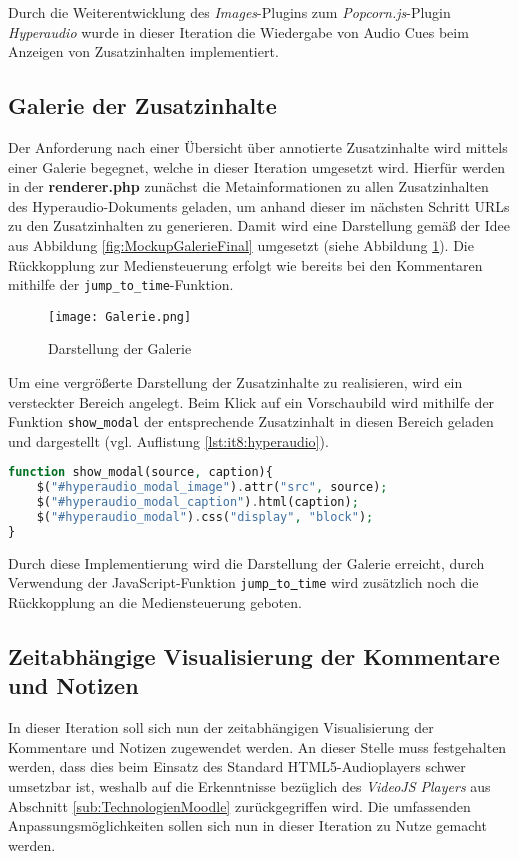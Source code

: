 Durch die Weiterentwicklung des \textit{Images}-Plugins zum \textit{Popcorn.js}-Plugin \textit{Hyperaudio} wurde in dieser Iteration die Wiedergabe von Audio Cues beim Anzeigen von Zusatzinhalten implementiert.

\subsection{Galerie der Zusatzinhalte}
Der Anforderung nach einer Übersicht über annotierte Zusatzinhalte wird mittels einer Galerie begegnet, welche in dieser Iteration umgesetzt wird. Hierfür werden in der \textbf{renderer.php} zunächst die Metainformationen zu allen Zusatzinhalten des Hyperaudio-Dokuments geladen, um anhand dieser im nächsten Schritt URLs zu den Zusatzinhalten zu generieren. Damit wird eine Darstellung gemäß der Idee aus Abbildung \ref{fig:MockupGalerieFinal} umgesetzt (siehe Abbildung \ref{fig:Galerie}). Die Rückkopplung zur Mediensteuerung erfolgt wie bereits bei den Kommentaren mithilfe der \texttt{jump_to_time}-Funktion.

\begin{figure}[h!]
\texttt{[image: Galerie.png]}
\caption{\label{fig:Galerie}Darstellung der Galerie}
\end{figure}


Um eine vergrößerte Darstellung der Zusatzinhalte zu realisieren, wird ein versteckter Bereich angelegt. Beim Klick auf ein Vorschaubild wird mithilfe der Funktion \texttt{show\underline{{ }}modal} der entsprechende Zusatzinhalt in diesen Bereich geladen und dargestellt (vgl. Auflistung \ref{lst:it8:hyperaudio}). 

\begin{lstlisting}[language=php,
             linewidth=\textwidth,
             caption={Ausschnitt der \textbf{hyperaudio.js} in der 8. Iteration},
             label={lst:it8:hyperaudio}]
function show_modal(source, caption){
    $("#hyperaudio_modal_image").attr("src", source);
    $("#hyperaudio_modal_caption").html(caption);
    $("#hyperaudio_modal").css("display", "block");
}
\end{lstlisting}

Durch diese Implementierung wird die Darstellung der Galerie erreicht, durch Verwendung der JavaScript-Funktion \texttt{jump\underline{{ }}to\underline{{ }}time} wird zusätzlich noch die Rückkopplung an die Mediensteuerung geboten. 

\subsection{Zeitabhängige Visualisierung der Kommentare und Notizen}
In dieser Iteration soll sich nun der zeitabhängigen Visualisierung der Kommentare und Notizen zugewendet werden. An dieser Stelle muss festgehalten werden, dass dies beim Einsatz des Standard HTML5-Audioplayers schwer umsetzbar ist, weshalb auf die Erkenntnisse bezüglich des \textit{VideoJS Players} aus Abschnitt \ref{sub:TechnologienMoodle} zurückgegriffen wird. Die umfassenden Anpassungsmöglichkeiten sollen sich nun in dieser Iteration zu Nutze gemacht werden.

